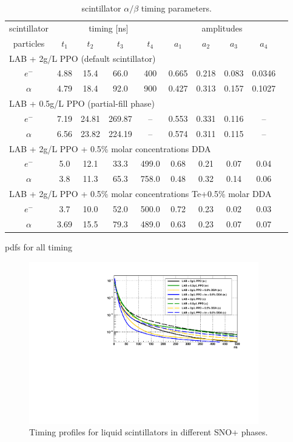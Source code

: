 \begin{table}[ht]
	\caption[]{scintillator $\alpha/\beta$ timing parameters\cite{tanner0p5,joshW1,chicagoTiming}.}	\label{scint_timing} 
				\centering
		\begin{tabular*}{165mm}{c@{\extracolsep{\fill}}*9c}
			\toprule 
			\multicolumn{1}{c}{scintillator} & \multicolumn{4}{c}{timing [ns]} & \multicolumn{4}{c}{amplitudes}\\
			\cline{0-1}\cline{2-5} \cline{6-9}		
			 particles      & $t_1$ & $t_2$ & $t_3$ & $t_4$ & $a_1$ &$a_2$ &$a_3$&$a_4$\\
			\midrule
			\multicolumn{9}{l}{LAB + 2g/L PPO (default scintillator)}\\
			$e^-$ & 4.88 & 15.4 & 66.0 & 400 & 0.665 & 0.218 & 0.083& 0.0346\\	
		    $\alpha$ & 4.79 & 18.4 & 92.0 & 900 & 0.427 & 0.313 & 0.157 & 0.1027\\
		    \hline
		    \multicolumn{9}{l}{LAB + 0.5g/L PPO (partial-fill phase)} \\
			$e^-$& 7.19 & 24.81 & 269.87 & -- &0.553 &0.331 &0.116 & --\\
			$\alpha$& 6.56 &23.82 &224.19&--& 0.574&0.311& 0.115&--\\
			\hline
			\multicolumn{9}{l}{LAB + 2g/L PPO + 0.5\% molar concentrations DDA} \\
			$e^-$ & 5.0& 12.1& 33.3& 499.0& 0.68& 0.21& 0.07& 0.04\\
			$\alpha$ &3.8 &11.3& 65.3& 758.0& 0.48& 0.32& 0.14& 0.06 \\
			\hline
			\multicolumn{9}{l}{LAB + 2g/L PPO + 0.5\% molar concentrations Te+0.5\% molar DDA}\\
			$e^-$ & 3.7 & 10.0 & 52.0  & 500.0 & 0.72 & 0.23 & 0.02 &0.03\\
			$\alpha$ & 3.69 & 15.5 & 79.3  & 489.0 & 0.63 & 0.23 & 0.07 &0.07\\	
			\bottomrule	
		\end{tabular*}
\end{table}


pdfs for all timing

\begin{figure}[!htb]
	\centering
	\includegraphics[width=10cm]{plotAllTiming.pdf}
	\caption{Timing profiles for liquid scintillators in different SNO+ phases.}
	\label{allTiming}
\end{figure}

